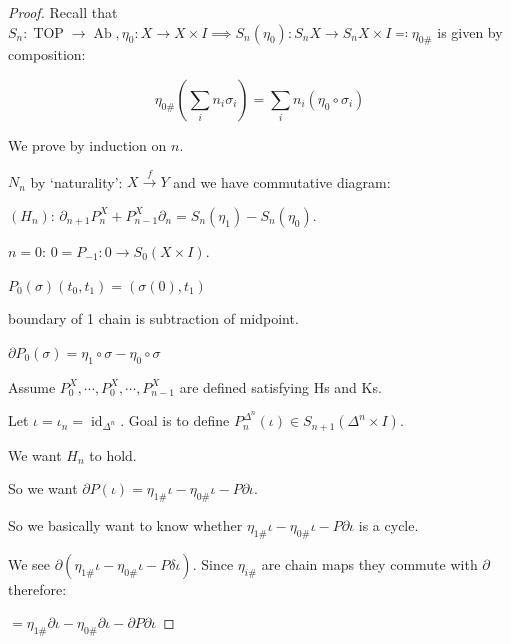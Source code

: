 \documentclass{article}
\theoremstyle{definition}
\begin{document}
    \begin{proof}
        Recall that \(S_n: \operatorname{TOP} \to \operatorname{Ab}, \eta_0: X \to X \times I \implies S_n(\eta_0): S_n X \to S_n X \times I \eqqcolon \eta_{0\#}\) is given by composition:

        \[
            \eta_{0\#} \left( \sum_{i} n_i \sigma_i \right) = \sum_{i} n_i (\eta_0 \circ \sigma_i)
        \]

        We prove by induction on \(n\).

        \(N_n\) by `naturality': \(X \xrightarrow{f} Y\) and we have commutative diagram:

        \begin{center}
        \end{center}


        \((H_n): \, \partial_{n+1} P_n^X + P_{n-1}^X \partial_n = S_n(\eta_1) - S_n(\eta_0)\).

        \(n=0\): \(0 = P_{-1}: 0 \to S_0(X \times I)\).

        \(P_0(\sigma) (t_0, t_1) = (\sigma(0),t_1)\) 

        boundary of 1 chain is subtraction of midpoint.

        \(\partial P_0(\sigma) = \eta_1 \circ \sigma - \eta_0 \circ \sigma\)
        
        Assume \(P_0^X, \cdots, P_0^X, \cdots , P_{n-1}^X\) are defined satisfying Hs and Ks.

        Let \(\iota = \iota_n = \operatorname{id}_{\Delta^n}\). Goal is to define \(P_n^{\Delta^n}(\iota) \in S_{n+1} (\Delta^n \times I)\).

        We want \(H_n\) to hold.

        So we want \(\partial P(\iota) = \eta_{1\#}\iota - \eta_{0\#} \iota - P \partial \iota\).
        
        So we basically want to know whether \(\eta_{1\#}\iota - \eta_{0\#}\iota - P \partial \iota\) is a cycle.

        We see \(\partial (\eta_{1\#}\iota - \eta_{0\#}\iota - P \delta \iota)\). Since \(\eta_{i\#}\) are chain maps they commute with \(\partial\) therefore:

        \(= \eta_{1\#} \partial \iota - \eta_{0\#} \partial \iota - \partial P \partial \iota\)
        

\end{proof}
\end{document}
